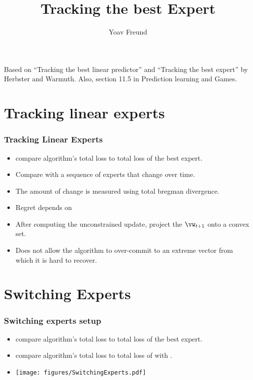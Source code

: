 \documentclass[handout]{beamer}
\title %
{Tracking the best Expert}
\author[Freund] %
{Yoav Freund}
\institute[Universities of Somewhere and Elsewhere] %
\begin{document}
%


\begin{frame}
  \titlepage
  Based on ``Tracking the best linear predictor'' and ``Tracking the
  best expert'' by Herbster and Warmuth. Also, section 11.5 in
  Prediction learning and Games.
\end{frame}




\section{Tracking linear experts}
\begin{frame}
\frametitle{Tracking Linear Experts }
\begin{itemize}
\item {} compare algorithm's total loss to total
  loss of the best expert.
\item {} Compare with a sequence of experts that
  change over time.
\item The amount of change is measured using total bregman
  divergence.
\item Regret depends on 
\item {} After computing the unconstrained
  update, project the $\vw_{t+1}$ onto a convex set.
\item Does not allow the algorithm to over-commit to an extreme vector
  from which it is hard to recover.
\end{itemize}
\end{frame}


\section{Switching Experts}

\begin{frame}
\frametitle{Switching experts setup}
\begin{itemize}
\item {} compare algorithm's total loss to total
  loss of the best expert.
\item {} compare algorithm's total loss to total
  loss of  with  .
\item
\texttt{[image: figures/SwitchingExperts.pdf]}
\end{itemize}
\end{frame}
\end{document}
